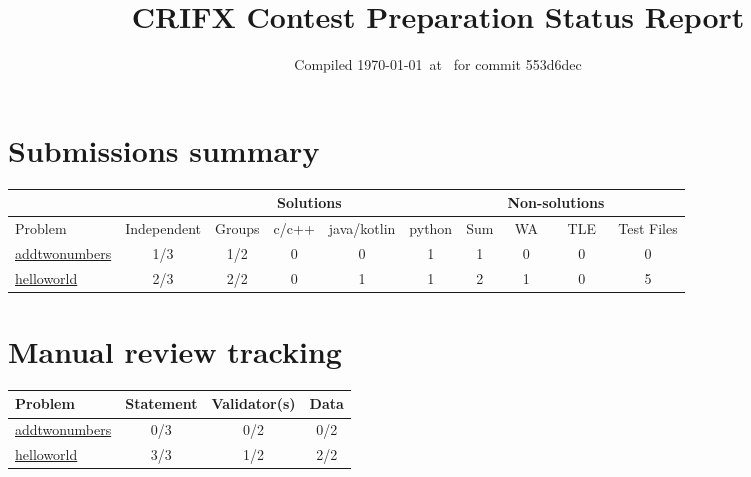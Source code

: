 \documentclass{article}%
\title{CRIFX Contest Preparation Status Report}%
\date{Compiled \today~at \DTMcurrenttime\DTMcurrentzone~for commit 553d6dec}%
\begin{document}
%
\normalsize%
\maketitle%
\section{Submissions summary}%
\label{sec:Submissionssummary}%
\begin{tabular}{|l|c|c|c|c|c|c|c|c|c|}%
\hline%
\rowcolor{cyan}%
&\multicolumn{6}{c}{{\tiny Solutions}}&\multicolumn{2}{|c|}{{\tiny Non-solutions}}&\\%
\hline%
\rowcolor{cyan}%
{\tiny Problem}&{\tiny Independent}&{\tiny Groups}&{\tiny c/c++}&{\tiny java/kotlin}&{\tiny python}&{\tiny Sum}&{\tiny WA}&{\tiny TLE}&{\tiny Test Files}\\%
\hline%
\hyperref[sec:addtwonumbers]{addtwonumbers}&\cellcolor{insufficientred}1/3&\cellcolor{insufficientred}1/2&0&0&1&1&0&0&0\\%
\hline%
\hyperref[sec:helloworld]{helloworld}&\cellcolor{insufficientred}2/3&\cellcolor{sufficientgreen}2/2&0&1&1&2&1&0&5\\%
\hline%
\end{tabular}

%
\section{Manual review tracking}%
\label{sec:Manualreviewtracking}%
\begin{tabular}{|l|c|c|c|}%
\hline%
\rowcolor{cyan}%
{\tiny Problem}&{\tiny Statement}&{\tiny Validator(s)}&{\tiny Data}\\%
\hline%
\hyperref[sec:addtwonumbers]{addtwonumbers}&\cellcolor{insufficientred}0/3&\cellcolor{insufficientred}0/2&\cellcolor{insufficientred}0/2\\%
\hline%
\hyperref[sec:helloworld]{helloworld}&\cellcolor{sufficientgreen}3/3&\cellcolor{insufficientred}1/2&\cellcolor{sufficientgreen}2/2\\%
\hline%
\end{tabular}

%
\end{document}

